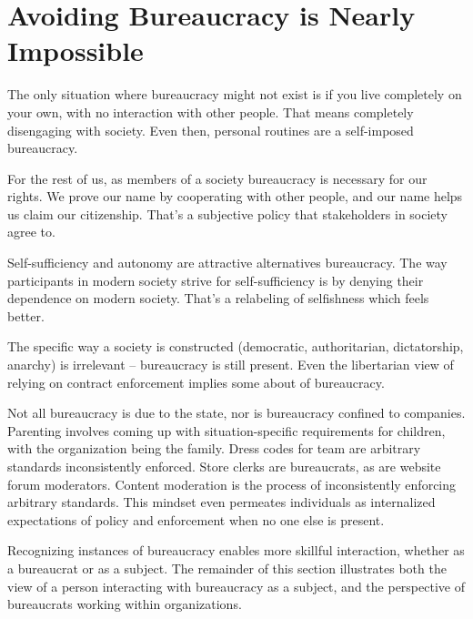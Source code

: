 \section{Avoiding Bureaucracy is Nearly Impossible}

The only situation where bureaucracy might not exist is if you live completely on your own, with no interaction with other people. That means completely disengaging with society. Even then, personal routines are a self-imposed bureaucracy.


For the rest of us, as members of a society bureaucracy is necessary for our rights. We prove our name by cooperating with other people, and our name helps us claim our citizenship. That's a subjective policy that \glspl{stakeholder} in society agree to. 

Self-sufficiency and autonomy are attractive alternatives bureaucracy. The way participants in modern society strive for self-sufficiency is by denying their dependence on modern society. That's a relabeling of selfishness which feels better. 

The specific way a society is constructed (democratic, authoritarian, dictatorship, anarchy) is irrelevant -- bureaucracy is still present. Even the libertarian view of relying on contract enforcement implies some about of bureaucracy. 


Not all bureaucracy is due to the state, nor is bureaucracy confined to companies. Parenting involves coming up with situation-specific requirements for children, with the organization being the family. Dress codes for team are arbitrary standards inconsistently enforced. 
Store clerks are bureaucrats, as are website forum moderators.  Content moderation is the process of inconsistently enforcing arbitrary standards. This mindset even permeates individuals as internalized expectations of policy and enforcement when no one else is present. 

Recognizing instances of bureaucracy enables more skillful interaction, whether as a bureaucrat or as a subject. The remainder of this section  illustrates both the view of a person interacting with bureaucracy as a \gls{subject}, and the perspective of bureaucrats working within organizations. 




